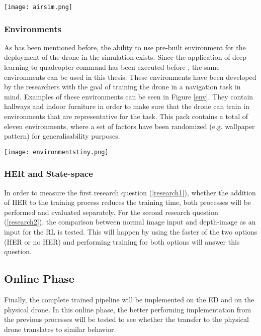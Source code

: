 \begin{Figure}
    \centering
    \texttt{[image: airsim.png]}
    \label{airsim}
\end{Figure}

\subsubsection{Environments}
As has been mentioned before, the ability to use pre-built environment for the 
deployment of the drone in the simulation exists. Since the application of 
deep learning to quadcopter command has been executed before \cite{DroneRLUsingTransferLearning}, the same environments 
can be used in this thesis. These environments have been developed by the 
researchers with the goal of training the drone in a navigation task in mind. 
Examples of these environments 
can be seen in Figure \ref{env}. They contain hallways and indoor furniture 
in order to make sure that the drone can train in environments that are representative 
for the task. This pack contains a total of eleven environments, where a set of factors 
have been randomized (e.g. wallpaper pattern) for generalisability purposes. 

\begin{Figure}
    \centering
    \texttt{[image: environmentstiny.png]}
    \label{env}
\end{Figure}

\subsubsection{HER and State-space}
In order to measure the first research question (\ref{research1}), 
whether the addition of HER to the training process reduces the 
training time, both processes will be performed and evaluated separately. 
For the second research question (\ref{research2}), the comparison between 
normal image input and depth-image as an input for the RL is tested. This will 
happen by using the faster of the two options (HER or no HER) and performing 
training for both options will answer this question. 

\subsection{Online Phase}
Finally, the complete trained pipeline will be implemented on the ED and on 
the physical drone. In this online phase, the better performing implementation 
from the previous processes will be tested to see whether the transfer to the 
physical drone translates to similar behavior.  

